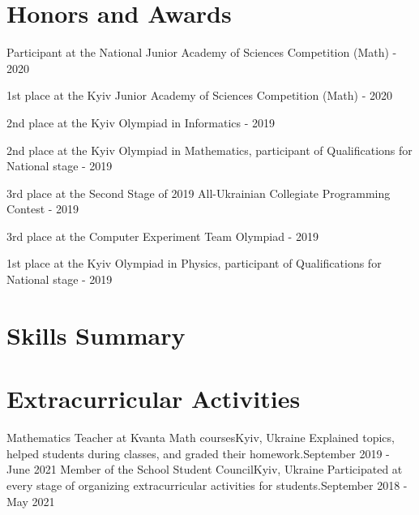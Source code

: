 \documentclass[a4paper,21pt]{article}
\begin{document}
\vspace{-5pt}
\section{Honors and Awards}
\begin{description}[font=$\bullet$]
\item {Participant at the National Junior Academy of Sciences Competition (Math) - 2020}
\vspace{-5pt}
\item {1st place at the Kyiv Junior Academy of Sciences Competition (Math) - 2020}
\vspace{-5pt}
\item {2nd place at the Kyiv Olympiad in Informatics - 2019}
\vspace{-5pt}
\item {2nd place at the Kyiv Olympiad in Mathematics, participant of Qualifications for National stage - 2019}
\vspace{-5pt}
\item {3rd place at the Second Stage of 2019 All-Ukrainian Collegiate Programming Contest - 2019}
\vspace{-5pt}
\item {3rd place at the Computer Experiment Team Olympiad - 2019}
\vspace{-5pt}
\item {1st place at the Kyiv Olympiad in Physics, participant of Qualifications for National stage - 2019}
\end{description}


\vspace{-5pt}
\section{Skills Summary}
  \resumeSubHeadingListStart
  \resumeSubHeadingListEnd

\vspace{-6pt}
\section{Extracurricular Activities}
  \resumeSubHeadingListStart
	\nonBulletResumeSubheading
    {Mathematics Teacher at Kvanta Math courses}{Kyiv, Ukraine}
    {Explained topics, helped students during classes, and graded their homework.}{September 2019 - June 2021}
  \nonBulletResumeSubheading
    {Member of the School Student Council}{Kyiv, Ukraine}
    {Participated at every stage of organizing extracurricular activities for students.}{September 2018 - May 2021}

\resumeSubHeadingListEnd
\end{document}
